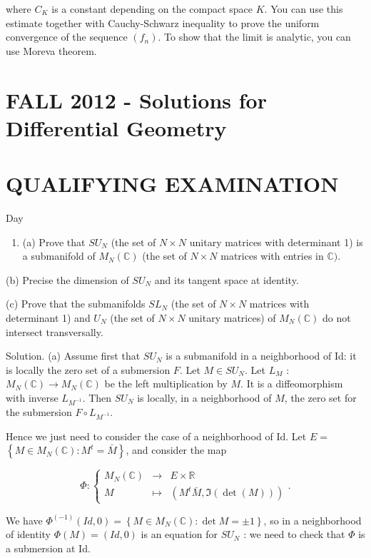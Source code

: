 \documentclass[10pt]{article}
\begin{document}
where $C_{K}$ is a constant depending on the compact space $K$. You can use this estimate together with Cauchy-Schwarz inequality to prove the uniform convergence of the sequence $\left(f_{n}\right)$. To show that the limit is analytic, you can use Moreva theorem.

\section*{FALL 2012 - Solutions for Differential Geometry }
\section{QUALIFYING EXAMINATION}
Day

\begin{enumerate}
  \item (a) Prove that $S U_{N}$ (the set of $N \times N$ unitary matrices with determinant 1) is a submanifold of $M_{N}(\mathbb{C})$ (the set of $N \times N$ matrices with entries in $\mathbb{C})$.
\end{enumerate}

(b) Precise the dimension of $S U_{N}$ and its tangent space at identity.

(c) Prove that the submanifolds $S L_{N}$ (the set of $N \times N$ matrices with determinant 1) and $U_{N}$ (the set of $N \times N$ unitary matrices) of $M_{N}(\mathbb{C})$ do not intersect transversally.

Solution. (a) Assume first that $S U_{N}$ is a submanifold in a neighborhood of Id: it is locally the zero set of a submersion $F$. Let $M \in S U_{N}$. Let $L_{M}$ : $M_{N}(\mathbb{C}) \rightarrow M_{N}(\mathbb{C})$ be the left multiplication by $M$. It is a diffeomorphism with inverse $L_{M^{-1}}$. Then $S U_{N}$ is locally, in a neighborhood of $M$, the zero set for the submersion $F \circ L_{M^{-1}}$.

Hence we just need to consider the case of a neighborhood of Id. Let $E=$ $\left\{M \in M_{N}(\mathbb{C}): M^{t}=\bar{M}\right\}$, and consider the map

$$
\Phi:\left\{\begin{array}{ccc}
M_{N}(\mathbb{C}) & \rightarrow & E \times \mathbb{R} \\
M & \mapsto & \left(M^{t} \bar{M}, \Im(\operatorname{det}(M))\right)
\end{array} .\right.
$$

We have $\Phi^{(-1)}(I d, 0)=\left\{M \in M_{N}(\mathbb{C}): \operatorname{det} M= \pm 1\right\}$, so in a neighborhood of identity $\Phi(M)=(I d, 0)$ is an equation for $S U_{N}$ : we need to check that $\Phi$ is a submersion at Id.
\end{document}
